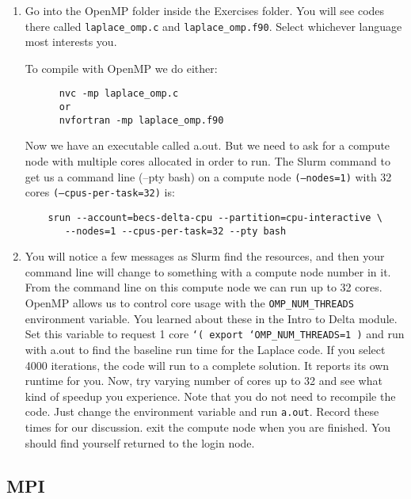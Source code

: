 \documentclass[11pt]{article}
\begin{document}
\begin{enumerate}
  \item{Go into the OpenMP folder inside the Exercises folder. You will see codes there called \texttt{laplace\_omp.c} and \texttt{laplace\_omp.f90}. Select whichever language most interests you.
  
  To compile with OpenMP we do either:
    \begin{verbatim}
      nvc -mp laplace_omp.c
      or
      nvfortran -mp laplace_omp.f90
    \end{verbatim}
    
  Now we have an executable called a.out. But we need to ask for a compute node with multiple cores allocated in order to run. The Slurm command to get us a command line (--pty bash) on a compute node \texttt{(--nodes=1)} with 32 cores \texttt{(--cpus-per-task=32)} is:
    \begin{verbatim}
    srun --account=becs-delta-cpu --partition=cpu-interactive \
       --nodes=1 --cpus-per-task=32 --pty bash

    \end{verbatim}
  }

  \item {You will notice a few messages as Slurm find the resources, and then your command line will change to something with a compute node number in it. From the command line on this compute node we can run up to 32 cores. OpenMP allows us to control core usage with the \texttt{OMP\_NUM\_THREADS} environment variable. You learned about these in the Intro to Delta module. Set this variable to request 1 core \texttt{`( export `OMP\_NUM\_THREADS=1 )} and run with a.out to find the baseline run time for the Laplace code. If you select 4000 iterations, the code will run to a complete solution. It reports its own runtime for you. Now, try varying number of cores up to 32 and see what kind of speedup you experience. Note that you do not need to recompile the code. Just change the environment variable and run \texttt{a.out}. Record these times for our discussion. exit the compute node when you are finished. You should find yourself returned to the login node. }
\end{enumerate}

\subsection{MPI} 
\end{document}
